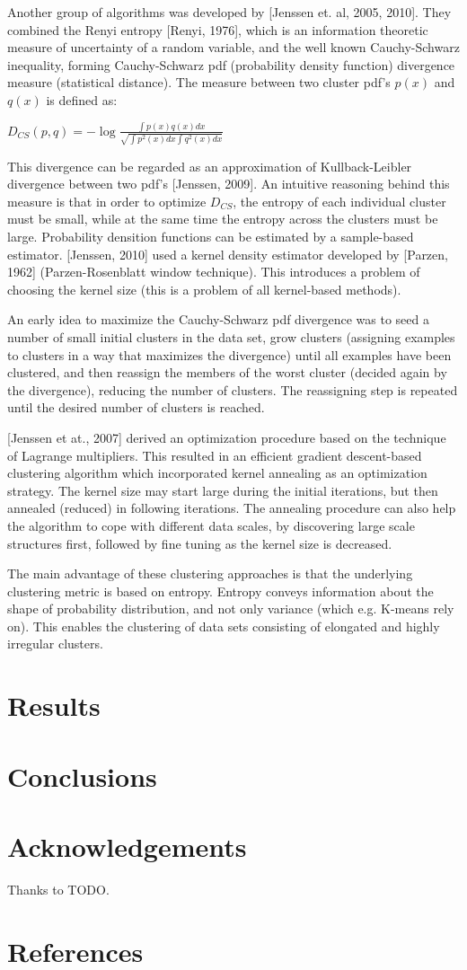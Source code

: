 \documentclass[conference]{IEEEtran}
\begin{document}
Another group of algorithms was developed by [Jenssen et. al, 2005, 2010]. They combined
the Renyi entropy [Renyi, 1976], which is an information theoretic measure of uncertainty of a random variable,
and the well known Cauchy-Schwarz inequality, forming Cauchy-Schwarz pdf (probability density function)
divergence measure (statistical distance). The measure between two cluster pdf's $p(x)$ and $q(x)$ is defined as:

$D_{CS}(p, q) = -\log \frac{\int p(x)q(x)dx}{\sqrt{\int p^2(x)dx \int q^2(x)dx}}$

This divergence can be regarded as an approximation of Kullback-Leibler divergence between two pdf's [Jenssen, 2009].
An intuitive reasoning behind this measure is that in order to optimize $D_{CS}$, the entropy of each individual cluster must
be small, while at the same time the entropy across the clusters must be large.
Probability densition functions can be estimated by a sample-based estimator. [Jenssen, 2010] used a kernel
density estimator developed by [Parzen, 1962] (Parzen-Rosenblatt window technique). This introduces a problem of
choosing the kernel size (this is a problem of all kernel-based methods).

An early idea to maximize the Cauchy-Schwarz pdf divergence was to seed a number
of small initial clusters in the data set, grow clusters (assigning examples to clusters
in a way that maximizes the divergence) until all examples have been clustered, and then
reassign the members of the worst cluster (decided again by the divergence), reducing the number of clusters. 
The reassigning step is repeated until the desired number of clusters is reached.

[Jenssen et at., 2007] derived an optimization procedure based on the technique of Lagrange multipliers.
This resulted in an efficient gradient descent-based clustering algorithm which incorporated kernel annealing
as an optimization strategy. The kernel size may start large during the initial iterations, but then annealed (reduced)
in following iterations. The annealing procedure can also help the algorithm to cope with different data scales,
by discovering large scale structures first, followed by fine tuning as the kernel size is decreased.

The main advantage of these clustering approaches is that the underlying clustering metric is
based on entropy. Entropy conveys information about the shape of probability distribution,
and not only variance (which e.g. K-means rely on). This enables the clustering of data sets consisting of
elongated and highly irregular clusters.


\section{Results}

\section{Conclusions}

\section*{Acknowledgements}
Thanks to TODO.

\section*{References}
\end{document}
